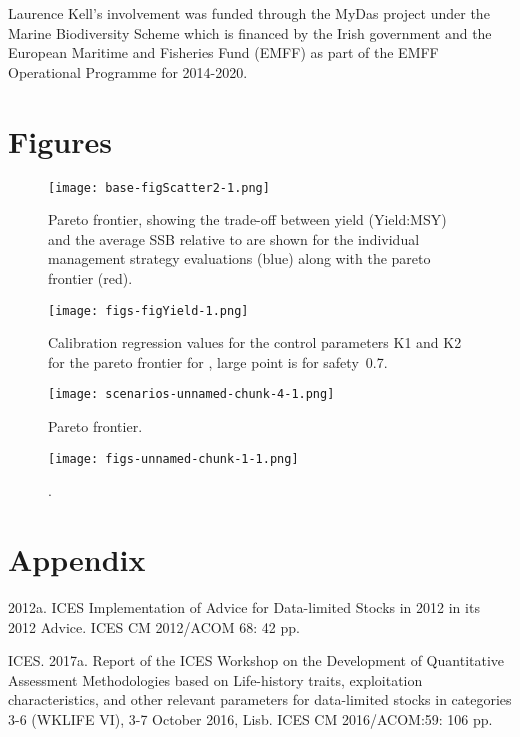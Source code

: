 \documentclass[12pt,doublespacing,a4paper]{ouparticle}
\begin{document}
Laurence Kell's involvement was funded through the MyDas project under the Marine Biodiversity Scheme which is financed by the Irish government and the European Maritime and Fisheries Fund (EMFF) as part of the EMFF Operational Programme for 2014-2020. 

\clearpage




\clearpage
\section{Figures}

\newpage
\begin{figure}[h]
\centering
\texttt{[image: base-figScatter2-1.png]}
\caption{Pareto frontier, showing  the trade-off between yield (Yield:MSY) and the average SSB relative to  are shown for the individual management strategy evaluations (blue) along with the pareto frontier (red).}
\label{fig:pareto}
\end{figure}

\newpage
\begin{figure}[h]
\centering
\texttt{[image: figs-figYield-1.png]}
\caption{Calibration regression values for the control parameters K1 and K2 for the pareto frontier for , large point is for safety~0.7.}
\label{fig:control}
\end{figure}

\newpage
\begin{figure}[h]
\centering
\texttt{[image: scenarios-unnamed-chunk-4-1.png]}
\caption{Pareto frontier.}
\label{fig:voi}
\end{figure}

\newpage
\begin{figure}[h]
\centering
\texttt{[image: figs-unnamed-chunk-1-1.png]}
\caption{.}
\label{fig:mse}
\end{figure}


\clearpage
\section{Appendix}


2012a. ICES Implementation of Advice for Data-limited Stocks in 2012 in its 2012 Advice. ICES CM 2012/ACOM 68: 42 pp.

ICES. 2017a. Report of the ICES Workshop on the Development of Quantitative Assessment Methodologies based on Life-history traits, exploitation characteristics, and other relevant parameters for data-limited stocks in categories 3-6 (WKLIFE VI), 3-7 October 2016, Lisb. ICES CM 2016/ACOM:59: 106 pp.
\end{document}

